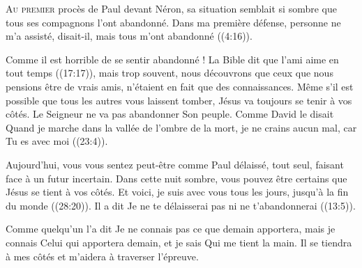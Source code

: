 \lettrine{A}{u premier} procès de Paul devant Néron,
 sa situation semblait si sombre que tous ses compagnons l'ont abandonné.
 \Og Dans ma première défense, personne ne m'a assisté,
 disait-il, mais tous m'ont abandonné \Fg{}
 ((4:16)).

Comme il est horrible de se sentir abandonné !
 La Bible dit que \Og l'ami 
 aime en tout temps \Fg{} ((17:17)), mais trop souvent,
 nous découvrons que ceux que nous pensions être de vrais amis,
 n'étaient en fait que des connaissances.
 Même s'il est possible que tous les autres vous laissent tomber,
 Jésus va toujours se tenir à vos côtés.
 Le Seigneur ne va pas abandonner Son peuple.
 Comme David le disait\frcolon {}
 \Og Quand je marche dans la vallée de l'ombre de la mort,
 je ne crains aucun mal, car Tu es avec moi \Fg{} ((23:4)).


Aujourd'hui, vous vous sentez peut-être comme Paul \ocadr délaissé,
 tout seul, faisant face à un futur incertain.
 Dans cette nuit sombre, vous pouvez être certains que Jésus
 se tient à vos côtés.
 \Og Et voici, je suis avec vous tous les jours, jusqu'à la fin du monde \Fg{}
 ((28:20)).
 Il a dit\frcolon {}
 \Og Je ne te délaisserai pas ni ne t'abandonnerai \Fg{}
 ((13:5)). 

Comme quelqu'un l'a dit\frcolon {}
 \Og Je ne connais 
 pas ce que demain apportera, mais je connais Celui qui apportera demain,
 et je sais Qui me tient la main. \Fg{}
 Il se tiendra à mes côtés et m'aidera à traverser l'épreuve. 

\dvrule






